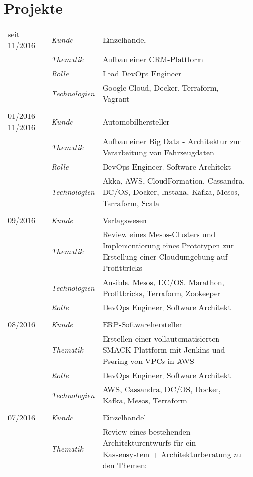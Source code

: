 \section*{Projekte}
\renewcommand{\arraystretch}{1.3}
\begin{longtable}{@{}>{}p{4cm}>{\itshape}p{2cm}>{}p{9cm}}
seit 11/2016        & Kunde 	    & Einzelhandel\\
\nopagebreak		& Thematik	    & Aufbau einer CRM-Plattform\\
\nopagebreak		& Rolle 	    & Lead DevOps Engineer\\
\nopagebreak		& Technologien	& Google Cloud, Docker, Terraform, Vagrant\\
\\
01/2016-11/2016       & Kunde 	    & Automobilhersteller\\
\nopagebreak		& Thematik	    & Aufbau einer Big Data - Architektur zur Verarbeitung von Fahrzeugdaten\\
\nopagebreak		& Rolle 	    & DevOps Engineer, Software Architekt\\
\nopagebreak		& Technologien	& Akka, AWS, CloudFormation, Cassandra, DC/OS, Docker, Instana, Kafka, Mesos, Terraform, Scala\\
\\
09/2016             & Kunde 	    & Verlagswesen\\
\nopagebreak		& Thematik	    & Review eines Mesos-Clusters und Implementierung eines Prototypen zur Erstellung einer Cloudumgebung auf Profitbricks\\
\nopagebreak		& Technologien	& Ansible, Mesos, DC/OS, Marathon, Profitbricks, Terraform, Zookeeper\\
\nopagebreak		& Rolle 	    & DevOps Engineer, Software Architekt\\
\\
08/2016             & Kunde 	    & ERP-Softwarehersteller\\
\nopagebreak		& Thematik	    & Erstellen einer vollautomatisierten SMACK-Plattform mit Jenkins und Peering von VPCs in AWS\\
\nopagebreak		& Rolle 	    & DevOps Engineer, Software Architekt\\
\nopagebreak		& Technologien	& AWS, Cassandra, DC/OS, Docker, Kafka, Mesos, Terraform\\
\\
07/2016             & Kunde 	    & Einzelhandel\\
\nopagebreak		& Thematik	    & Review eines bestehenden Architekturentwurfs für ein Kassensystem + Architekturberatung zu den Themen:\\

\end{longtable}
